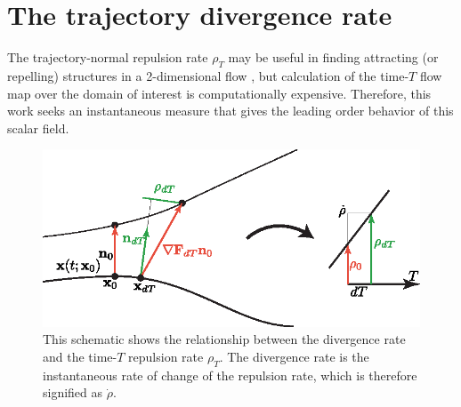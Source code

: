 \documentclass[twocolumn]{svjour3}
\begin{document}
\section{The trajectory divergence rate}\label{s:Derivation}
The trajectory-normal repulsion rate \(\rho_T\) may be useful in finding attracting (or repelling) structures in a 2-dimensional flow \cite{haller_variational_2011}, but calculation of the time-$T$ flow map over the domain of interest is computationally expensive. Therefore, this work seeks an instantaneous measure that gives the leading order behavior of this scalar field.

\begin{figure}
\centering
\includegraphics[width=4.5in]{Figures/div-rate-schematic.eps}
\caption{This schematic shows the relationship between the divergence rate and the time-$T$ repulsion rate $\rho_T$. The divergence rate is the instantaneous rate of change of the repulsion rate, which is therefore signified as $\dot{\rho}$.}
\label{fig:div-rate-schematic}
\end{figure}
\end{document}
